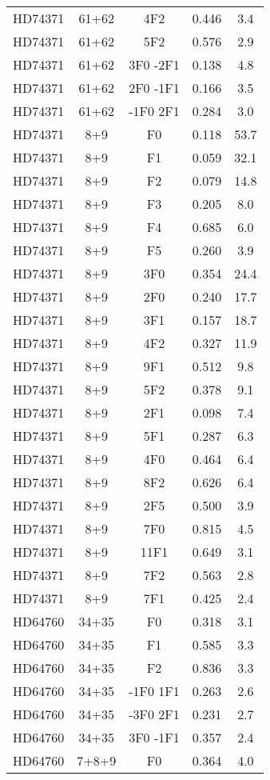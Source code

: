 \begin{table*}
\begin{tabular}{l c c c c}
HD74371 & 61+62 & 4F2 & 0.446 & 3.4\\ 
HD74371 & 61+62 & 5F2 & 0.576 & 2.9\\ 
HD74371 & 61+62 & 3F0 -2F1 & 0.138 & 4.8\\ 
HD74371 & 61+62 & 2F0 -1F1 & 0.166 & 3.5\\ 
HD74371 & 61+62 & -1F0 2F1 & 0.284 & 3.0\\ 
\hline
HD74371 & 8+9 & F0 & 0.118 & 53.7\\ 
HD74371 & 8+9 & F1 & 0.059 & 32.1\\ 
HD74371 & 8+9 & F2 & 0.079 & 14.8\\ 
HD74371 & 8+9 & F3 & 0.205 & 8.0\\ 
HD74371 & 8+9 & F4 & 0.685 & 6.0\\ 
HD74371 & 8+9 & F5 & 0.260 & 3.9\\ 
HD74371 & 8+9 & 3F0 & 0.354 & 24.4\\ 
HD74371 & 8+9 & 2F0 & 0.240 & 17.7\\ 
HD74371 & 8+9 & 3F1 & 0.157 & 18.7\\ 
HD74371 & 8+9 & 4F2 & 0.327 & 11.9\\ 
HD74371 & 8+9 & 9F1 & 0.512 & 9.8\\ 
HD74371 & 8+9 & 5F2 & 0.378 & 9.1\\ 
HD74371 & 8+9 & 2F1 & 0.098 & 7.4\\ 
HD74371 & 8+9 & 5F1 & 0.287 & 6.3\\ 
HD74371 & 8+9 & 4F0 & 0.464 & 6.4\\ 
HD74371 & 8+9 & 8F2 & 0.626 & 6.4\\ 
HD74371 & 8+9 & 2F5 & 0.500 & 3.9\\ 
HD74371 & 8+9 & 7F0 & 0.815 & 4.5\\ 
HD74371 & 8+9 & 11F1 & 0.649 & 3.1\\ 
HD74371 & 8+9 & 7F2 & 0.563 & 2.8\\ 
HD74371 & 8+9 & 7F1 & 0.425 & 2.4\\ 
\hline
HD64760 & 34+35 & F0 & 0.318 & 3.1\\ 
HD64760 & 34+35 & F1 & 0.585 & 3.3\\ 
HD64760 & 34+35 & F2 & 0.836 & 3.3\\ 
HD64760 & 34+35 & -1F0 1F1 & 0.263 & 2.6\\ 
HD64760 & 34+35 & -3F0 2F1 & 0.231 & 2.7\\ 
HD64760 & 34+35 & 3F0 -1F1 & 0.357 & 2.4\\ 
\hline
HD64760 & 7+8+9 & F0 & 0.364 & 4.0\\ 

\end{tabular}
\end{table*}
